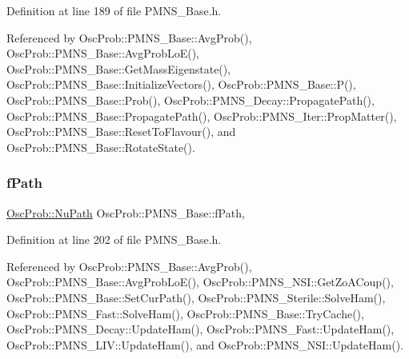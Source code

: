 Definition at line 189 of file P\+M\+N\+S\+\_\+\+Base.\+h.



Referenced by Osc\+Prob\+::\+P\+M\+N\+S\+\_\+\+Base\+::\+Avg\+Prob(), Osc\+Prob\+::\+P\+M\+N\+S\+\_\+\+Base\+::\+Avg\+Prob\+Lo\+E(), Osc\+Prob\+::\+P\+M\+N\+S\+\_\+\+Base\+::\+Get\+Mass\+Eigenstate(), Osc\+Prob\+::\+P\+M\+N\+S\+\_\+\+Base\+::\+Initialize\+Vectors(), Osc\+Prob\+::\+P\+M\+N\+S\+\_\+\+Base\+::\+P(), Osc\+Prob\+::\+P\+M\+N\+S\+\_\+\+Base\+::\+Prob(), Osc\+Prob\+::\+P\+M\+N\+S\+\_\+\+Decay\+::\+Propagate\+Path(), Osc\+Prob\+::\+P\+M\+N\+S\+\_\+\+Base\+::\+Propagate\+Path(), Osc\+Prob\+::\+P\+M\+N\+S\+\_\+\+Iter\+::\+Prop\+Matter(), Osc\+Prob\+::\+P\+M\+N\+S\+\_\+\+Base\+::\+Reset\+To\+Flavour(), and Osc\+Prob\+::\+P\+M\+N\+S\+\_\+\+Base\+::\+Rotate\+State().

\mbox{\label{classOscProb_1_1PMNS__Base_a849437aa8891fe042e86886ce8f81c6e}} 
\subsubsection{\texorpdfstring{f\+Path}{fPath}}
{\footnotesize\ttfamily \hyperlink{structOscProb_1_1NuPath}{Osc\+Prob\+::\+Nu\+Path} Osc\+Prob\+::\+P\+M\+N\+S\+\_\+\+Base\+::f\+Path\hspace{0.3cm}{\ttfamily [protected]}, {\ttfamily [inherited]}}



Definition at line 202 of file P\+M\+N\+S\+\_\+\+Base.\+h.



Referenced by Osc\+Prob\+::\+P\+M\+N\+S\+\_\+\+Base\+::\+Avg\+Prob(), Osc\+Prob\+::\+P\+M\+N\+S\+\_\+\+Base\+::\+Avg\+Prob\+Lo\+E(), Osc\+Prob\+::\+P\+M\+N\+S\+\_\+\+N\+S\+I\+::\+Get\+Zo\+A\+Coup(), Osc\+Prob\+::\+P\+M\+N\+S\+\_\+\+Base\+::\+Set\+Cur\+Path(), Osc\+Prob\+::\+P\+M\+N\+S\+\_\+\+Sterile\+::\+Solve\+Ham(), Osc\+Prob\+::\+P\+M\+N\+S\+\_\+\+Fast\+::\+Solve\+Ham(), Osc\+Prob\+::\+P\+M\+N\+S\+\_\+\+Base\+::\+Try\+Cache(), Osc\+Prob\+::\+P\+M\+N\+S\+\_\+\+Decay\+::\+Update\+Ham(), Osc\+Prob\+::\+P\+M\+N\+S\+\_\+\+Fast\+::\+Update\+Ham(), Osc\+Prob\+::\+P\+M\+N\+S\+\_\+\+L\+I\+V\+::\+Update\+Ham(), and Osc\+Prob\+::\+P\+M\+N\+S\+\_\+\+N\+S\+I\+::\+Update\+Ham().

